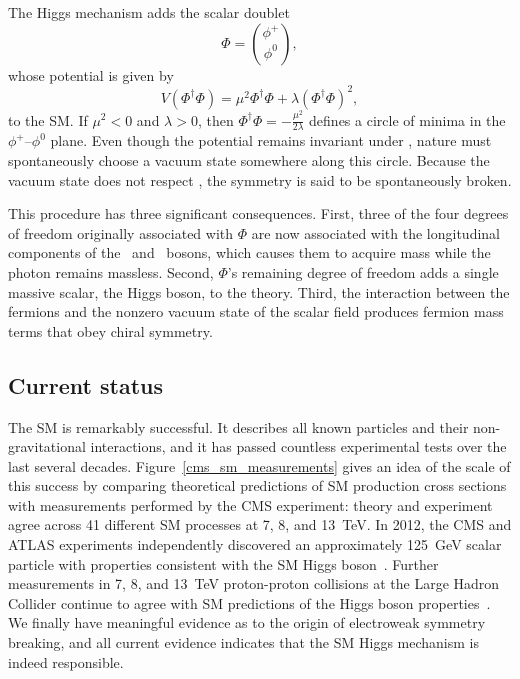 The Higgs mechanism adds the scalar doublet
\begin{equation}
    \Phi = \binom{\phi^{+}}{\phi^{0}},
\end{equation}
whose potential is given by
\begin{equation}
    V(\Phi^{\dagger}\Phi) = \mu^{2}\Phi^{\dagger}\Phi + \lambda(\Phi^{\dagger}\Phi)^{2},
\end{equation}
to the SM. If $\mu^{2}<0$ and $\lambda>0$, then $\Phi^{\dagger}\Phi = -\frac{\mu^{2}}{2\lambda}$ defines a circle of minima in the $\phi^{+}$--$\phi^{0}$ plane. Even though the potential remains invariant under \ewsymm, nature must spontaneously choose a vacuum state somewhere along this circle. Because the vacuum state does not respect \ewsymm, the symmetry is said to be spontaneously broken.

This procedure has three significant consequences. First, three of the four degrees of freedom originally associated with $\Phi$ are now associated with the longitudinal components of the \PWpm\ and \cPZ\ bosons, which causes them to acquire mass while the photon remains massless. Second, $\Phi$'s remaining degree of freedom adds a single massive scalar, the Higgs boson, to the theory. Third, the interaction between the fermions and the nonzero vacuum state of the scalar field produces fermion mass terms that obey chiral symmetry.


\subsection{Current status}
\label{sm_status}
The SM is remarkably successful. It describes all known particles and their non-gravitational interactions, and it has passed countless experimental tests over the last several decades. Figure~\ref{cms_sm_measurements} gives an idea of the scale of this success by comparing theoretical predictions of SM production cross sections with measurements performed by the CMS experiment: theory and experiment agree across 41 different SM processes at \num{7}, \num{8}, and \SI{13}{\TeV}. In 2012, the CMS and ATLAS experiments  independently discovered an approximately \SI{125}{\GeV} scalar particle with properties consistent with the SM Higgs boson~\cite{cms_higgs, atlas_higgs}. Further measurements in \num{7}, \num{8}, and \SI{13}{\TeV} proton-proton collisions at the Large Hadron Collider continue to agree with SM predictions of the Higgs boson properties~\cite{cms_higgs_summary, atlas_higgs_summary}. We finally have meaningful evidence as to the origin of electroweak symmetry breaking, and all current evidence indicates that the SM Higgs mechanism is indeed responsible.

